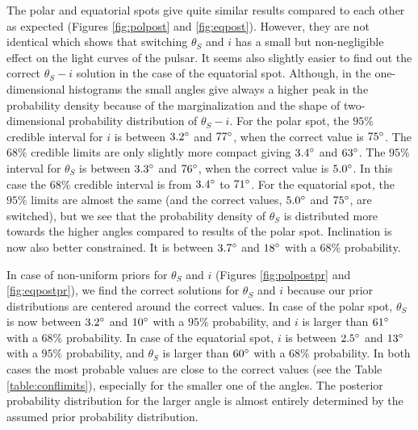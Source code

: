 \documentclass{wihuri}
\def\thetas{\theta_{S}}
\begin{document}
The polar and equatorial spots give quite similar results compared to each other as expected (Figures \ref{fig:polpost} and \ref{fig:eqpost}). However, they are not identical which shows that switching $\thetas$ and $i$ has a small but non-negligible effect on the light curves of the pulsar. It seems also slightly easier to find out the correct $\thetas-i$ solution in the case of the equatorial spot. Although, in the one-dimensional histograms the small angles give always a higher peak in the probability density because of the marginalization and the shape of two-dimensional probability distribution of $\thetas-i$. For the polar spot, the $95 \%$ credible interval for $i$ is between $3.2 \degree$ and $77 \degree$, when the correct value is $75 \degree$. %
The $68 \%$ credible limits are only slightly more compact giving $3.4 \degree$ and $63 \degree$. The $95 \%$ interval for $\thetas$ is between $3.3 \degree$ and $76 \degree$, when the correct value is $5.0 \degree$. In this case the $68 \%$ credible interval is from $3.4 \degree$ to $71 \degree$. For the equatorial spot, the $95 \%$ limits are almost the same (and the correct values, $5.0 \degree$ and $75 \degree$, are switched), but we see that the probability density of $\thetas$ is distributed more towards the higher angles compared to results of the polar spot. Inclination is now also better constrained. It is between $3.7 \degree$ and $18 \degree$ with a $68 \%$ probability.

In case of non-uniform priors for $\thetas$ and $i$ (Figures \ref{fig:polpostpr} and \ref{fig:eqpostpr}), we find the correct solutions for $\thetas$ and $i$ because our prior distributions are centered around the correct values. %
In case of the polar spot, $\thetas$ is now between $3.2 \degree$ and $10 \degree$ with a $95 \%$ probability, and $i$ is larger than $61 \degree$ with a $68 \%$ probability. In case of the equatorial spot, $i$ is between $2.5 \degree$ and $13 \degree$ with a $95 \%$ probability, and $\thetas$ is larger than $60 \degree$ with a $68 \%$ probability. In both cases the most probable values are close to the correct values (see the Table \ref{table:conflimits}), especially for the smaller one of the angles. The posterior probability distribution for the larger angle is almost entirely determined by the assumed prior probability distribution.  
\end{document}
